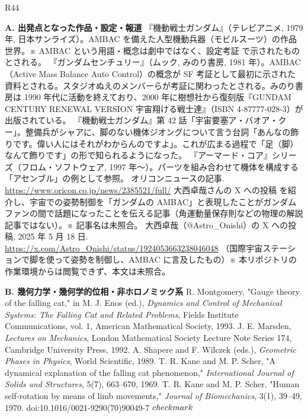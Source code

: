 \begin{thebibliography}{R44}
\small
\item[] \textbf{A. 出発点となった作品・設定・報道}
 『機動戦士ガンダム』（テレビアニメ, 1979 年, 日本サンライズ）。AMBAC を備えた人型機動兵器（モビルスーツ）の作品世界。※ AMBAC という用語・概念は劇中ではなく、設定考証 \cite{R42} で示されたものとされる。
 『ガンダムセンチュリー』（ムック, みのり書房, 1981 年）。AMBAC（Active Mass Balance Auto Control）の概念が SF 考証として最初に示された資料とされる。スタジオぬえのメンバーらが考証に関わったとされる。みのり書房は 1990 年代に活動を終えており、2000 年に樹想社から復刻版『GUNDAM CENTURY RENEWAL VERSION 宇宙翔ける戦士達』（ISBN 4-87777-028-3）が出版されている。
 『機動戦士ガンダム』第 42 話「宇宙要塞ア・バオア・クー」。整備兵がシャアに、脚のない機体ジオングについて言う台詞「あんなの飾りです。偉い人にはそれがわからんのですよ」。これが広まる過程で「足（脚）なんて飾りです」の形で知られるようになった。
 『アーマード・コア』シリーズ（フロム・ソフトウェア, 1997 年〜）。パーツを組み合わせて機体を構成する「アセンブル」の例として参照。
 オリコンニュースの記事. \url{https://www.oricon.co.jp/news/2385521/full/} 大西卓哉さんの X への投稿 \cite{R44} を紹介し、宇宙での姿勢制御を「ガンダムの AMBAC」と表現したことがガンダムファンの間で話題になったことを伝える記事（角運動量保存則などの物理の解説記事ではない）。※ 記事名は未照合。
 大西卓哉（@Astro\_Onishi）の X への投稿, 2025 年 5 月 18 日. \url{https://x.com/Astro_Onishi/status/1924053663238046048} （国際宇宙ステーションで脚を使って姿勢を制御し、AMBAC に言及したもの）※ 本リポジトリの作業環境からは閲覧できず、本文は未照合。
\item[] \textbf{B. 幾何力学・幾何学的位相・非ホロノミック系}
 R. Montgomery, "Gauge theory of the falling cat," in M. J. Enos (ed.), \textit{Dynamics and Control of Mechanical Systems: The Falling Cat and Related Problems}, Fields Institute Communications, vol. 1, American Mathematical Society, 1993.
 J. E. Marsden, \textit{Lectures on Mechanics}, London Mathematical Society Lecture Note Series 174, Cambridge University Press, 1992.
 A. Shapere and F. Wilczek (eds.), \textit{Geometric Phases in Physics}, World Scientific, 1989.
 T. R. Kane and M. P. Scher, "A dynamical explanation of the falling cat phenomenon," \textit{International Journal of Solids and Structures}, 5(7), 663–670, 1969.
 T. R. Kane and M. P. Scher, "Human self-rotation by means of limb movements," \textit{Journal of Biomechanics}, 3(1), 39–49, 1970. doi:10.1016/0021-9290(70)90049-7 $\\checkmark$

\end{thebibliography}
